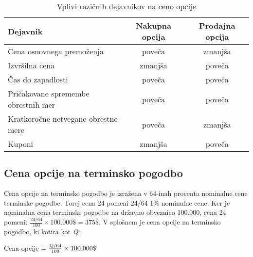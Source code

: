 \documentclass[a4paper]{article}
\begin{document}
\begin{table}
    \begin{tabular}{l|c|c}
        Dejavnik & Nakupna opcija & Prodajna opcija \\
        \hline\hline
        Cena osnovnega premoženja & poveča & zmanjša \\
        Izvršilna cena & zmanjša & poveča \\
        Čas do zapadlosti & poveča & poveča \\
        Pričakovane spremembe obrestnih mer & poveča & poveča \\
        Kratkoročne netvegane obrestne mere & poveča & zmanjša \\
        Kuponi & zmanjša & poveča
    \end{tabular}
    \caption{Vplivi razičnih dejavnikov na ceno opcije}
\end{table}

\subsection{Cena opcije na terminsko pogodbo}
Cena opcije na terminsko pogodbo je izražena v 64-inah procenta nominalne cene terminske pogodbe. Torej cena 24 pomeni 24/64
1\% nominalne cene. Ker je nominalna cena terminske pogodbe na državno obveznico 100.000\textdollar, cena 24 pomeni:
\(\frac{24/64}{100} \times 100.000\$ = 375\$\). V splošnem je cena opcije na terminsko pogodbo, ki kotira kot \textit{Q}:
\begin{center}
    Cena opcije $ = \frac{\textit{\text{Q}}/64}{100} \times 100.000\$$
\end{center}
\end{document}
